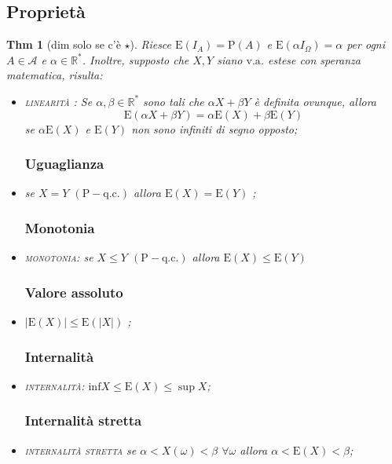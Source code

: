 \documentclass[a4paper,11pt]{article}
\theoremstyle{plain}
\newtheorem{thm}{Thm}[section]
\theoremstyle{definition}
\theoremstyle{remark}
\begin{document}
\subsection{Proprietà}
\begin{thm}[dim solo se c'è $\star$] Riesce $\mathrm{E}(I_{A})=\mathrm{P}(A)$ e $\mathrm{E}(\alpha I_{\Omega})=\alpha$ per ogni $ A\in \mathcal{A}$ e $\alpha\in \mathbb{R}^{*}$. Inoltre, supposto che $X, Y$ siano $\mathrm{v}.\mathrm{a}$. estese con speranza matematica, risulta:
\begin{itemize} 
\subsubsection{Linearità}
\item \textsc{linearità} : Se $\alpha, \beta\in \mathbb{R}^{*}$ sono tali che $\alpha X+\beta Y$ \`{e} definita ovunque, allora
$$
\mathrm{E}(\alpha X+\beta Y)=\alpha \mathrm{E}(X)+\beta \mathrm{E}(Y)
$$
se $\alpha \mathrm{E}(X)$ e $\mathrm{E}(Y)$ non sono infiniti di segno opposto;
\subsubsection{Uguaglianza}
\item  se $X=Y$ $(\mathrm{P}-\mathrm{q}.\mathrm{c}.)$ allora $\mathrm{E}(X)=\mathrm{E}(Y)$ ;
\subsubsection{Monotonia}
\item \textsc{monotonia}: se $X\leq Y$ $(\mathrm{P}-\mathrm{q}.\mathrm{c}.)$ allora $\mathrm{E}(X)\leq \mathrm{E}(Y)$
\subsubsection{Valore assoluto}
\item $\left|\mathrm{E}(X)\right|\leq \mathrm{E}(|X|)$ ;
\subsubsection{Internalità}
\item \textsc{internalità}: $\displaystyle \mathrm{i}\mathrm{n}\mathrm{f}X\leq \mathrm{E}(X)\leq\sup X$;
\subsubsection{Internalità stretta}
\item [$\star$] \textsc{internalità stretta} se $\alpha<X(\omega)<\beta$ $\forall \omega$ allora $\alpha<\mathrm{E}(X)<\beta$;

\end{itemize}
\end{thm}
\end{document}
